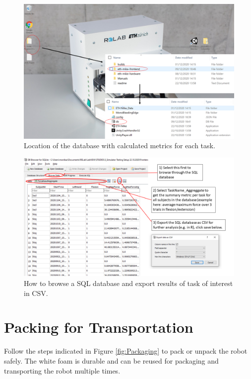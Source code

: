 \documentclass[10pt,oneside,a4paper]{article}
\begin{document}
\begin{figure}[h!]
\begin{center}
\includegraphics[width=\columnwidth]{images/TabletScreenshots/Database.png}
\caption{Location of the database with calculated metrics for each task.}
\label{fig:DatabaseLocation}
\end{center}
\end{figure}

\begin{figure}[h!]
\begin{center}
\includegraphics[width=\columnwidth]{images/TabletScreenshots/ExportDatabase.png}
\caption{How to browse a SQL database and export results of task of interest in CSV.}
\label{fig:SQLDatabase}
\end{center}
\end{figure}

\newpage
\phantom{blabla}
\newpage
\section{Packing for Transportation}
Follow the steps indicated in Figure \ref{fig:Packaging} to pack or unpack the robot safely. The white foam is durable and can be reused for packaging and transporting the robot multiple times.\\
\end{document}
